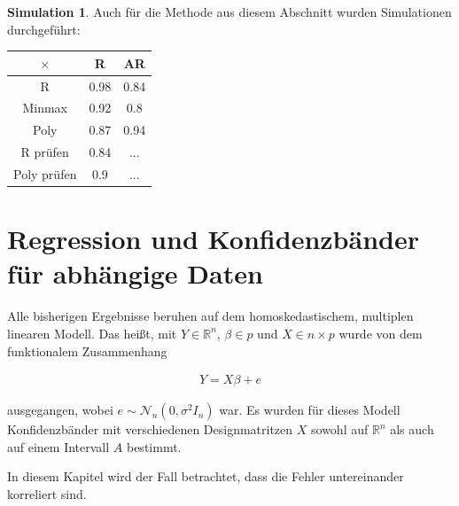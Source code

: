 \documentclass[12pt,a4paper]{article}
\theoremstyle{definition}
\theoremstyle{definition}
\theoremstyle{definition}
\newtheorem{Simulation}[Definition]{Simulation}
\theoremstyle{definition}
\newcommand{\UeberRR}{0.98}
\newcommand{\UeberRMinmax}{0.92}
\newcommand{\UeberRMinmaxPoly}{0.87}
\newcommand{\UeberARR}{0.84}
\newcommand{\UeberARMinmax}{0.8}
\newcommand{\UeberARMinmaxPoly}{0.94}
\newcommand{\UeberRRpruefen}{0.84}
\newcommand{\UeberRMinmaxPolypruefen}{0.9}
\newcommand{\UeberARRpruefen}{...}
\newcommand{\UeberARMinmaxPolypruefen}{...}
\begin{document}
\begin{Simulation}
Auch für die Methode aus diesem Abschnitt wurden Simulationen durchgeführt:

\begin{center}
\begin{tabular}{|c|c|c|}
\hline 
$\times$ & R & AR \\ 
\hline 
R		& \UeberRR			& \UeberARR \\ 
\hline 
Minmax	& \UeberRMinmax	 	& \UeberARMinmax \\ 
\hline 
Poly 	& \UeberRMinmaxPoly & \UeberARMinmaxPoly \\ 
\hline 
R prüfen	& \UeberRRpruefen & \UeberARRpruefen \\ 
\hline 
Poly prüfen	& \UeberRMinmaxPolypruefen & \UeberARMinmaxPolypruefen \\ 
\hline 
\end{tabular} 
\end{center}

\end{Simulation}





\newpage
\section{Regression und Konfidenzbänder für abhängige Daten}
\label{Regression und Konfidenzbänder für abhaengige Daten}
Alle bisherigen Ergebnisse beruhen auf dem homoskedastischem, multiplen linearen Modell. Das heißt, mit $Y \in \mathbb{R}^n$, $\beta \in p$ und $X \in n \times p$ wurde von dem funktionalem Zusammenhang

\begin{align} \label{Grundmodell_AR}
Y = X \beta + e
\end{align}

ausgegangen, wobei $e \sim \mathscr{N}_{n}(0, \sigma^2 I_n)$ war.  Es wurden für dieses Modell Konfidenzbänder mit verschiedenen Designmatritzen $X$ sowohl auf $\mathbb{R}^{n}$ als auch auf einem Intervall $A$ bestimmt.

In diesem Kapitel wird der Fall betrachtet, dass die Fehler untereinander korreliert sind. 
\end{document}
